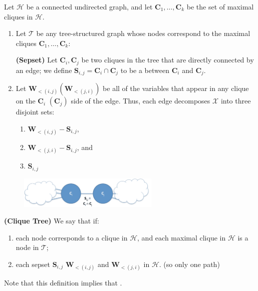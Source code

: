 \documentclass{article}
\newcommand{\bfs}[1]{\textbf{({#1}) }}
\begin{document}
 Let $\mathcal{H}$ be a connected undirected graph, and let $\boldsymbol{C}_{1}, \ldots, \boldsymbol{C}_{k}$ be the set of maximal cliques in $\mathcal{H}$. 
\begin{enumerate}
    \item Let $\mathcal{T}$ be any tree-structured graph whose nodes correspond to the maximal cliques $\boldsymbol{C}_{1}, \ldots, \boldsymbol{C}_{k}$:
    \begin{defa}\bfs{Sepset}
    Let $\boldsymbol{C}_{i}, \boldsymbol{C}_{j}$ be two cliques in the tree that are directly connected by an edge; we define $\boldsymbol{S}_{i, j}=\boldsymbol{C}_{i} \cap \boldsymbol{C}_{j}$ to be a  between $\boldsymbol{C}_{i}$ and $\boldsymbol{C}_{j} .$
    \end{defa}
    \item Let $\boldsymbol{W}_{<(i, j)}\left(\boldsymbol{W}_{<(j, i)}\right)$ be all of the variables that appear in any clique on the $\boldsymbol{C}_{i}$ $\left(\boldsymbol{C}_{j}\right)$ side of the edge. Thus, each edge decomposes $\mathcal{X}$ into three disjoint sets:
\begin{enumerate}
    \item $\boldsymbol{W}_{<(i, j)}-\boldsymbol{S}_{i, j}$,
    \item  $\boldsymbol{W}_{<(j, i)}-\boldsymbol{S}_{i, j}$, and
    \item  $\boldsymbol{S}_{i, j}$
\end{enumerate} 
\end{enumerate}
\begin{figure}[H]
    \centering
    \includegraphics[width=0.6\textwidth]{Figs/a22.png}
\end{figure}

\begin{defa}\bfs{Clique Tree}
We say that  if:
\begin{enumerate}
    \item  each node corresponds to a clique in $\mathcal{H}$, and each maximal clique in $\mathcal{H}$ is a node in $\mathcal{T}$;
    \item each sepset $\boldsymbol{S}_{i, j}$  $\boldsymbol{W}_{<(i, j)}$ and $\boldsymbol{W}_{<(j, i)}$ in $\mathcal{H}$. (so only one path)
\end{enumerate}
\end{defa}
\begin{rema}
Note that this definition implies that .
\end{rema}
\end{document}
